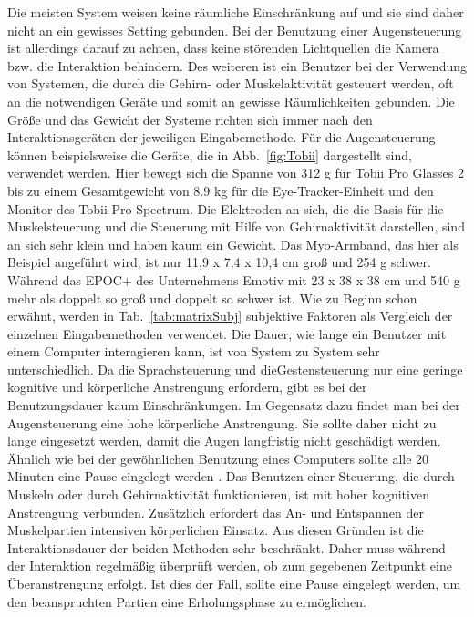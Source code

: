 \newline \newline \newline \newline \newline
Die meisten System weisen keine räumliche Einschränkung auf und sie sind daher nicht an ein gewisses Setting gebunden. Bei der Benutzung einer Augensteuerung ist allerdings darauf zu achten, dass keine störenden Lichtquellen die Kamera bzw. die Interaktion behindern. Des weiteren ist ein Benutzer bei der Verwendung von Systemen, die durch die Gehirn- oder Muskelaktivität gesteuert werden, oft an die notwendigen Geräte und somit an gewisse Räumlichkeiten gebunden.
\newline \newline
Die Größe und das Gewicht der Systeme richten sich immer nach den Interaktionsgeräten der jeweiligen Eingabemethode. Für die Augensteuerung können beispielsweise die Geräte, die in Abb.~\ref{fig:Tobii} dargestellt sind, verwendet werden. Hier bewegt sich die Spanne von 312 g für Tobii Pro Glasses 2 bis zu einem Gesamtgewicht von 8.9 kg für die Eye-Tracker-Einheit und den Monitor des Tobii Pro Spectrum. Die Elektroden an sich, die die Basis für die Muskelsteuerung und die Steuerung mit Hilfe von Gehirnaktivität darstellen, sind an sich sehr klein und haben kaum ein Gewicht. Das Myo-Armband, das hier als Beispiel angeführt wird, ist nur 11,9 x 7,4 x 10,4 cm groß und 254 g schwer. Während das EPOC+ des Unternehmens Emotiv mit 23 x 38 x 38 cm und 540 g mehr als doppelt so groß und doppelt so schwer ist.
\newline \newline
Wie zu Beginn schon erwähnt, werden in Tab.~\ref{tab:matrixSubj} subjektive Faktoren als Vergleich der einzelnen Eingabemethoden verwendet.
\newline \newline
Die Dauer, wie lange ein Benutzer mit einem Computer interagieren kann, ist von System zu System sehr unterschiedlich. Da die Sprachsteuerung und die\linebreak Gestensteuerung nur eine geringe kognitive und körperliche Anstrengung erfordern, gibt es bei der Benutzungsdauer kaum Einschränkungen. Im Gegensatz dazu findet man bei der Augensteuerung eine hohe körperliche Anstrengung. Sie sollte daher nicht zu lange eingesetzt werden, damit die Augen langfristig nicht geschädigt werden. Ähnlich wie bei der gewöhnlichen Benutzung eines Computers sollte alle 20 Minuten eine Pause eingelegt werden \cite{20Methode}. Das Benutzen einer Steuerung, die durch Muskeln oder durch Gehirnaktivität funktionieren, ist mit hoher kognitiven Anstrengung verbunden. Zusätzlich erfordert das An- und Entspannen der Muskelpartien intensiven körperlichen Einsatz. Aus diesen Gründen ist die Interaktionsdauer der beiden Methoden sehr beschränkt. Daher muss während der Interaktion regelmäßig überprüft werden, ob zum gegebenen Zeitpunkt eine Überanstrengung erfolgt. Ist dies der Fall, sollte eine Pause eingelegt werden, um den beanspruchten Partien eine Erholungsphase zu ermöglichen.
